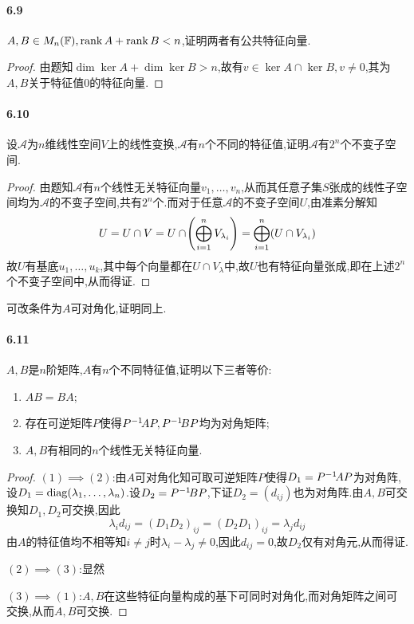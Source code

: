 \documentclass[11pt]{article}
\begin{document}
\paragraph{6.9}$A,B\in M_n(\mathbb{F}), \operatorname{rank} A+\operatorname{rank} B<n$,证明两者有公共特征向量.
\begin{proof}
    由题知$\dim \ker A + \dim \ker B > n$,故有$v\in \ker A \cap \ker B, v\neq 0$,其为$A,B$关于特征值0的特征向量.
\end{proof}
\paragraph{6.10}设$\mathscr{A}$为$n$维线性空间$V$上的线性变换,$\mathscr{A}$有$n$个不同的特征值,证明$\mathscr{A}$有$2^n$个不变子空间.
\begin{proof}
    由题知$\mathscr{A}$有$n$个线性无关特征向量$v_1,\dots,v_n$,从而其任意子集$S$张成的线性子空间均为$\mathscr{A}$的不变子空间,共有$2^n$个.而对于任意$\mathscr{A}$的不变子空间$U$,由准素分解知
    $$U=U\cap V=U\cap \!\left(\bigoplus_{i=1}^n V_{\lambda_i}\right)=\bigoplus_{i=1}^n (U\cap V_{\lambda_i})$$
    故$U$有基底$u_1,\dots,u_k$,其中每个向量都在$U\cap V_\lambda$中,故$U$也有特征向量张成,即在上述$2^n$个不变子空间中,从而得证.
\end{proof}
\begin{remark}
    可改条件为$A$可对角化,证明同上.
\end{remark}
\paragraph{6.11}$A,B$是$n$阶矩阵,$A$有$n$个不同特征值,证明以下三者等价:
\begin{enumerate}
    \item $AB=BA$;
    \item 存在可逆矩阵$P$使得$P^{-1}\! AP, P^{-1}\! BP$均为对角矩阵;
    \item $A,B$有相同的$n$个线性无关特征向量.
\end{enumerate}
\begin{proof}
    $(1)\implies (2)$:由$A$可对角化知可取可逆矩阵$P$使得$D_1=P^{-1}\! AP$为对角阵,设$D_1=\operatorname{diag}(\lambda_1,\dots,\lambda_n)$.设$D_2=P^{-1}\! BP$,下证$D_2=(d_{ij})$也为对角阵.由$A,B$可交换知$D_1,D_2$可交换,因此
    $$\lambda_i d_{ij}=(D_1D_2)_{ij}=(D_2D_1)_{ij}=\lambda_j d_{ij}$$
    由$A$的特征值均不相等知$i\neq j$时$\lambda_i-\lambda_j\neq 0$,因此$d_{ij}=0$,故$D_2$仅有对角元,从而得证.

    $(2)\implies (3)$:显然

    $(3)\implies (1)$:$A,B$在这些特征向量构成的基下可同时对角化,而对角矩阵之间可交换,从而$A,B$可交换.
\end{proof}
\end{document}

